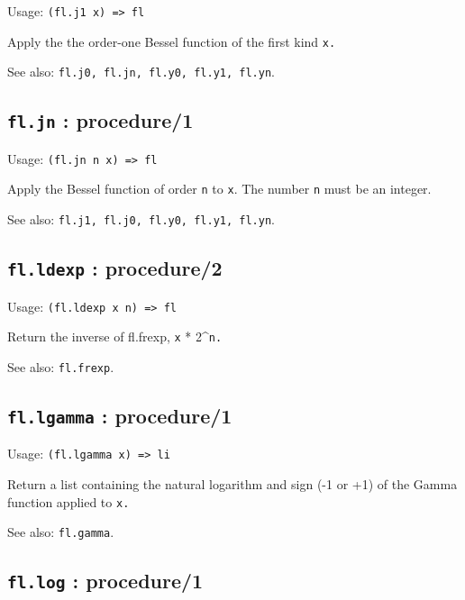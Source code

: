 \documentclass[
]{article}
\newcommand{\passthrough}[1]{#1}
\begin{document}
Usage: \passthrough{\lstinline!(fl.j1 x) => fl!}

Apply the the order-one Bessel function of the first kind
\passthrough{\lstinline!x.!}

See also: \passthrough{\lstinline!fl.j0, fl.jn, fl.y0, fl.y1, fl.yn!}.

\hypertarget{fl.jn-procedure1-1}{%
\subsection{\texorpdfstring{\texttt{fl.jn} :
procedure/1}{fl.jn : procedure/1}}\label{fl.jn-procedure1-1}}

Usage: \passthrough{\lstinline!(fl.jn n x) => fl!}

Apply the Bessel function of order \passthrough{\lstinline!n!} to
\passthrough{\lstinline!x!}. The number \passthrough{\lstinline!n!} must
be an integer.

See also: \passthrough{\lstinline!fl.j1, fl.j0, fl.y0, fl.y1, fl.yn!}.

\hypertarget{fl.ldexp-procedure2-1}{%
\subsection{\texorpdfstring{\texttt{fl.ldexp} :
procedure/2}{fl.ldexp : procedure/2}}\label{fl.ldexp-procedure2-1}}

Usage: \passthrough{\lstinline!(fl.ldexp x n) => fl!}

Return the inverse of fl.frexp, \passthrough{\lstinline!x!} *
2\^{}\passthrough{\lstinline!n.!}

See also: \passthrough{\lstinline!fl.frexp!}.

\hypertarget{fl.lgamma-procedure1-1}{%
\subsection{\texorpdfstring{\texttt{fl.lgamma} :
procedure/1}{fl.lgamma : procedure/1}}\label{fl.lgamma-procedure1-1}}

Usage: \passthrough{\lstinline!(fl.lgamma x) => li!}

Return a list containing the natural logarithm and sign (-1 or +1) of
the Gamma function applied to \passthrough{\lstinline!x.!}

See also: \passthrough{\lstinline!fl.gamma!}.

\hypertarget{fl.log-procedure1-1}{%
\subsection{\texorpdfstring{\texttt{fl.log} :
procedure/1}{fl.log : procedure/1}}\label{fl.log-procedure1-1}}
\end{document}
